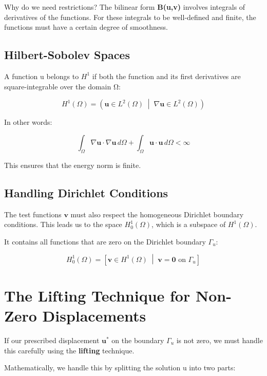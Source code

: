 \documentclass[
  11pt,
  a4paper,
]{scrbook}
\begin{document}
Why do we need restrictions? The bilinear form \textbf{B(u,v)} involves
integrals of derivatives of the functions. For these integrals to be
well-defined and finite, the functions must have a certain degree of
smoothness.

\subsection{Hilbert-Sobolev Spaces}\label{hilbert-sobolev-spaces}

A function u belongs to \(H^1\) if both the function and its first
derivatives are square-integrable over the domain Ω:

\[H^1(\Omega) = \left( \mathbf{u} \in L^2(\Omega) \; \middle| \; \nabla\mathbf{u} \in L^2(\Omega) \right)\]

In other words:

\[\int_{\Omega}\nabla \boldsymbol{u} \cdot\nabla \boldsymbol{u} \, d\Omega + \int_{\Omega} \boldsymbol{u} \cdot \boldsymbol{u} \, d\Omega < \infty\]

This ensures that the energy norm is finite.

\subsection{Handling Dirichlet
Conditions}\label{handling-dirichlet-conditions}

The test functions \(\boldsymbol{v}\) must also respect the homogeneous
Dirichlet boundary conditions. This leads us to the space
\(H^1_0(\Omega)\), which is a subspace of \(H^1(\Omega)\).

It contains all functions that are zero on the Dirichlet boundary
\(\Gamma_u\):

\[H^1_0(\Omega) = \left[ \mathbf{v} \in H^1(\Omega) \; \middle| \; \mathbf{v} = \mathbf{0} \text{ on } \Gamma_u \right]\]

\section{The Lifting Technique for Non-Zero
Displacements}\label{the-lifting-technique-for-non-zero-displacements}

If our prescribed displacement \(\boldsymbol{u}^*\) on the boundary
\(\Gamma_u\) is not zero, we must handle this carefully using the
\textbf{lifting} technique.

Mathematically, we handle this by splitting the solution u into two
parts:
\end{document}
